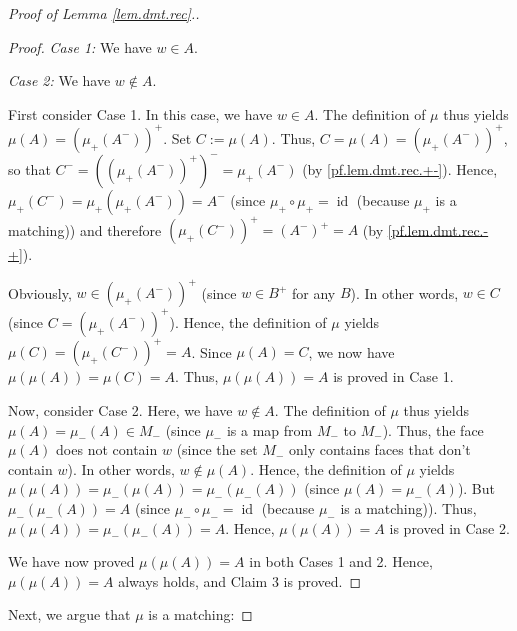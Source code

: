 \documentclass[12pt]{amsart}
\theoremstyle{definition}
\begin{document}
\begin{proof}[Proof of Lemma \ref{lem.dmt.rec}.]
\begin{proof}
\textit{Case 1:} We have $w\in A$.

\textit{Case 2:} We have $w\notin A$.

First consider Case 1. In this case, we have $w\in A$. The definition of $\mu$
thus yields $\mu\left(  A\right)  =\left(  \mu_+\left(  A^-\right)
\right)  ^+$. Set $C:=\mu\left(  A\right)  $. Thus, $C=\mu\left(  A\right)
=\left(  \mu_+\left(  A^-\right)  \right)  ^+$, so that $C^-=\left(
\left(  \mu_+\left(  A^-\right)  \right)  ^+\right)  ^-=\mu_+\left(
A^-\right)  $ (by \eqref{pf.lem.dmt.rec.+-}). Hence, $\mu_+\left(
C^-\right)  =\mu_+\left(  \mu_+\left(  A^-\right)  \right)  =A^-$
(since $\mu_+\circ\mu_+=\operatorname*{id}$ (because $\mu_+$ is a
matching)) and therefore $\left(  \mu_+\left(  C^-\right)  \right)
^+=\left(  A^-\right)  ^+=A$ (by \eqref{pf.lem.dmt.rec.-+}).

Obviously, $w\in\left(  \mu_+\left(  A^-\right)  \right)  ^+$ (since
$w\in B^+$ for any $B$). In other words, $w\in C$ (since $C=\left(  \mu
_+\left(  A^-\right)  \right)  ^+$). Hence, the definition of $\mu$
yields $\mu\left(  C\right)  =\left(  \mu_+\left(  C^-\right)  \right)
^+=A$. Since $\mu\left(  A\right)  =C$, we now have $\mu\left(  \mu\left(
A\right)  \right)  =\mu\left(  C\right)  =A$. Thus, $\mu\left(  \mu\left(
A\right)  \right)  =A$ is proved in Case 1.

Now, consider Case 2. Here, we have $w\notin A$. The definition of $\mu$ thus
yields $\mu\left(  A\right)  =\mu_-\left(  A\right)  \in M_-$ (since
$\mu_-$ is a map from $M_-$ to $M_-$). Thus, the face $\mu\left(
A\right)  $ does not contain $w$ (since the set $M_-$ only contains faces
that don't contain $w$). In other words, $w\notin\mu\left(  A\right)  $.
Hence, the definition of $\mu$ yields $\mu\left(  \mu\left(  A\right)
\right)  =\mu_-\left(  \mu\left(  A\right)  \right)  =\mu_-\left(  \mu
_-\left(  A\right)  \right)  $ (since $\mu\left(  A\right)  =\mu_-\left(
A\right)  $). But $\mu_-\left(  \mu_-\left(  A\right)  \right)  =A$ (since
$\mu_-\circ\mu_-=\operatorname*{id}$ (because $\mu_-$ is a matching)).
Thus, $\mu\left(  \mu\left(  A\right)  \right)  =\mu_-\left(  \mu_-\left(
A\right)  \right)  =A$. Hence, $\mu\left(  \mu\left(  A\right)  \right)  =A$
is proved in Case 2.

We have now proved $\mu\left(  \mu\left(  A\right)  \right)  =A$ in both Cases
1 and 2. Hence, $\mu\left(  \mu\left(  A\right)  \right)  =A$ always holds,
and Claim 3 is proved.
\end{proof}

Next, we argue that $\mu$ is a matching:


\end{proof}
\end{document}
